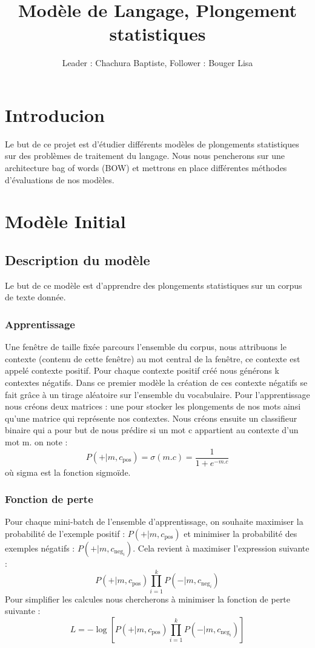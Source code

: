 \documentclass[12pt]{article}
\title{Modèle de Langage, Plongement statistiques}
\author{Leader : Chachura Baptiste, Follower : Bouger Lisa}
\begin{document}
\maketitle

\vspace{0.5in}


\section{Introducion}

Le but de ce projet est d'étudier différents modèles de plongements statistiques 
sur des problèmes de traitement du langage. Nous nous pencherons sur une architecture
bag of words (BOW) et mettrons en place différentes méthodes d'évaluations de nos modèles.

\section{Modèle Initial}
\subsection{Description du modèle}
Le but de ce modèle est d'apprendre des plongements statistiques sur un corpus de texte donnée.

\subsubsection{Apprentissage}
Une fenêtre de taille fixée parcours l'ensemble du corpus, nous attribuons le contexte (contenu de cette fenêtre)
au mot central de la fenêtre, ce contexte est appelé contexte positif. Pour chaque contexte positif
créé nous générons k contextes négatifs. Dans ce premier modèle la création de ces contexte négatifs se fait 
grâce à un tirage aléatoire sur l'ensemble du vocabulaire. Pour l'apprentissage nous créons deux matrices : une 
pour stocker les plongements de nos mots ainsi qu'une matrice qui représente nos contextes. Nous créons ensuite un classifieur 
binaire qui a pour but de nous prédire si un mot c appartient au contexte d'un mot m. on note : 
\[
    P(+|m, c_{\text{pos}}) = \sigma( m.c) = \frac{1}{1+e^{-m.c}}
\]
où sigma est la fonction sigmoïde.

\subsubsection{Fonction de perte}
Pour chaque mini-batch de l’ensemble d’apprentissage, on souhaite maximiser la probabilité de l’exemple positif : 
$P(+|m, c_{\text{pos}})$ et minimiser la probabilité des exemples négatifs : $P(+|m, c_{\text{neg}_i})$. Cela revient à maximiser l’expression suivante :
\[
P(+|m, c_{\text{pos}}) \prod_{i=1}^{k} P(-|m, c_{\text{neg}_i})
\]
Pour simplifier les calcules nous chercherons à minimiser la fonction de perte suivante : 
\[
L = - \log \left[ P(+|m, c_{\text{pos}}) \prod_{i=1}^{k} P(-|m, c_{\text{neg}_i}) \right]
\]
\end{document}
